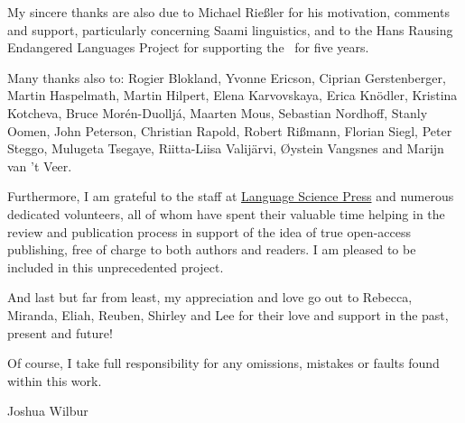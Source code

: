 My sincere thanks are also due %
to Michael Rießler for his motivation, comments and support, particularly concerning Saami linguistics, and 
to the Hans Rausing Endangered Languages Project for supporting the \PSDP\ for five years. 

\begin{sloppypar}
Many thanks also to:
Rogier Blokland, 
Yvonne Ericson, 
Ciprian Gerstenberger, 
Martin Haspelmath, 
Martin Hilpert, 
Elena Karvovskaya, 
Erica Knödler, 
Kristina Kotcheva, 
Bruce Morén-Duoll\-já, 
Maar\-ten Mous, 
Sebastian Nordhoff, 
Stanly Oomen, 
John Peterson, 
Christian Rapold, 
Robert Rißmann, 
Florian Siegl, 
Peter Steggo, 
Mulugeta Tsegaye, 
Riitta-Liisa Valijärvi, 
Øystein Vangs\-nes 
and 
Marijn van ’t Veer. 
\end{sloppypar}

Furthermore, I am grateful to the staff at \href{http://langsci-press.org/}{Language Science Press} and numerous dedicated volunteers, all of whom have spent their valuable time helping in the review and publication process in support of the idea of true open-access publishing, free of charge to both authors and readers. I am pleased to be included in this unprecedented project. 

And last but far from least, my appreciation and love go out to Rebecca, Miranda, Eliah, Reuben, Shirley and Lee for their love and support in the past, present and future!

Of course, I take full responsibility for any omissions, mistakes or faults found within this work. 

\hfill Joshua Wilbur

\hfill {}










%